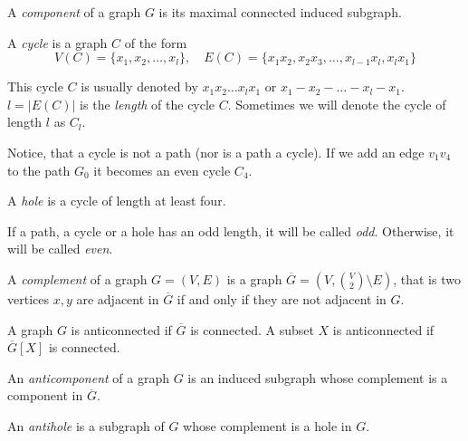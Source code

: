 \begin{defn}[component]
  A \emph{component} of a graph $G$ is its maximal connected induced subgraph.
\end{defn}


\begin{defn}[cycle]
  A \emph{cycle} is a graph $C$ of the form
  \[ V(C) = \{x_1, x_2, \ldots, x_l\},\quad E(C) = \{x_1x_2, x_2x_3, \ldots, x_{l-1}x_l, x_lx_1\} \]
\end{defn}

This cycle $C$ is usually denoted by $x_1x_2\ldots x_lx_1$ or $x_1 - x_2 - \ldots - x_l - x_1$. $l = |E(C)|$ is the \emph{length} of the cycle $C$. Sometimes we will denote the cycle of length $l$ as $C_l$.

Notice, that a cycle is not a path (nor is a path a cycle). If we add an edge $v_1v_4$ to the path $G_0$ it becomes an even cycle $C_4$.

\begin{defn}[hole]
  A \emph{hole} is a cycle of length at least four.
\end{defn}

If a path, a cycle or a hole has an odd length, it will be called \emph{odd}. Otherwise, it will be called \emph{even}.

\begin{defn}[complement]
  A \emph{complement} of a graph $G = (V, E)$ is a graph $\overline{G} = (V, {V \choose 2} \setminus E)$, that is two vertices $x, y$ are adjacent in $\overline{G}$ if and only if they are not adjacent in $G$.
\end{defn}


\begin{defn}
  A graph $G$ is anticonnected if $\overline{G}$ is connected.
  A subset $X$ is anticonnected if $\overline{G}[X]$ is connected.
\end{defn}

\begin{defn}[anticomponent]
  An \emph{anticomponent} of a graph $G$ is an induced subgraph whose complement is a component in $\overline{G}$.
\end{defn}

\begin{defn}[antihole]
  An \emph{antihole} is a subgraph of $G$ whose complement is a hole in $G$.
\end{defn}

